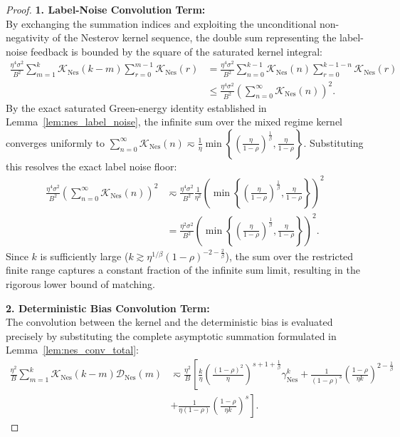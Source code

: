 \begin{proof}
\textbf{1. Label-Noise Convolution Term:} \\
By exchanging the summation indices and exploiting the unconditional non-negativity of the Nesterov kernel sequence, the double sum representing the label-noise feedback is bounded by the square of the saturated kernel integral:
\begin{align*}
    \frac{\eta^4\sigma^2}{B^2}\sum_{m=1}^{k}\mathcal K_{\mathrm{Nes}}(k-m)\sum_{r=0}^{m-1}\mathcal K_{\mathrm{Nes}}(r) 
    &= \frac{\eta^4\sigma^2}{B^2} \sum_{n=0}^{k-1} \mathcal K_{\mathrm{Nes}}(n) \sum_{r=0}^{k-1-n} \mathcal K_{\mathrm{Nes}}(r) \\
    &\le \frac{\eta^4\sigma^2}{B^2} \left( \sum_{n=0}^{\infty} \mathcal K_{\mathrm{Nes}}(n) \right)^2.
\end{align*}
By the exact saturated Green-energy identity established in Lemma~\ref{lem:nes_label_noise}, the infinite sum over the mixed regime kernel converges uniformly to $\sum_{n=0}^{\infty} \mathcal K_{\mathrm{Nes}}(n) \eqsim \frac{1}{\eta} \min\left\{\left(\frac{\eta}{1-\rho}\right)^{\frac1\beta}, \frac{\eta}{1-\rho}\right\}$. Substituting this resolves the exact label noise floor:
\begin{align*}
    \frac{\eta^4\sigma^2}{B^2} \left( \sum_{n=0}^{\infty} \mathcal K_{\mathrm{Nes}}(n) \right)^2 
    &\eqsim \frac{\eta^4\sigma^2}{B^2} \frac{1}{\eta^2} \left( \min\left\{\left(\frac{\eta}{1-\rho}\right)^{\frac1\beta}, \frac{\eta}{1-\rho}\right\} \right)^2 \\
    &= \frac{\eta^2\sigma^2}{B^2} \left( \min\left\{\left(\frac{\eta}{1-\rho}\right)^{\frac1\beta}, \frac{\eta}{1-\rho}\right\} \right)^2.
\end{align*}
Since $k$ is sufficiently large ($k \gtrsim \eta^{1/\beta}(1-\rho)^{-2-\frac{2}{\beta}}$), the sum over the restricted finite range captures a constant fraction of the infinite sum limit, resulting in the rigorous lower bound of matching.

\textbf{2. Deterministic Bias Convolution Term:} \\
The convolution between the kernel and the deterministic bias is evaluated precisely by substituting the complete asymptotic summation formulated in Lemma~\ref{lem:nes_conv_total}:
\begin{align*}
    \frac{\eta^2}{B}\sum_{m=1}^{k}\mathcal K_{\mathrm{Nes}}(k-m)\mathcal D_{\mathrm{Nes}}(m) 
    &\eqsim \frac{\eta^2}{B} \left[ \frac{k}{\eta} \left(\frac{(1-\rho)^2}{\eta}\right)^{s+1+\frac{1}{\beta}} \gamma_{\mathrm{Nes}}^k 
    + \frac{1}{(1-\rho)^3} \left(\frac{1-\rho}{\eta k}\right)^{2-\frac{1}{\beta}} \right.\\ 
     &\left. + \frac{1}{\eta(1-\rho)} \left(\frac{1-\rho}{\eta k}\right)^s \right].
\end{align*}


\end{proof}
